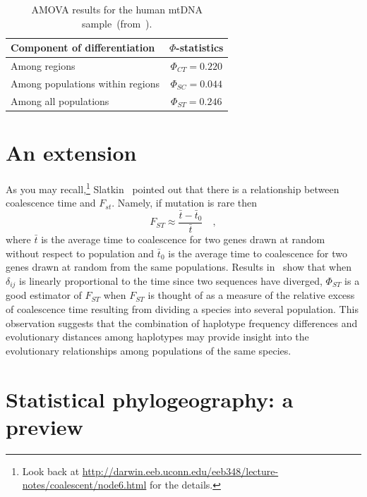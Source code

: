 \documentclass[12pt]{article}
\begin{document}
\begin{table}
\begin{center}
\begin{tabular}{lc}
\hline\hline
Component of differentiation     & $\Phi$-statistics \\
\hline
Among regions                    & $\Phi_{CT} = 0.220$ \\
Among populations within regions & $\Phi_{SC} = 0.044$ \\
Among all populations            & $\Phi_{ST} = 0.246$ \\
\hline
\end{tabular}
\end{center}
\caption{AMOVA results for the human mtDNA
  sample~(from~\cite{Excoffier-etal92}).}\label{table:amova-results}
\end{table}

\section*{An extension}

As you may recall,\footnote{Look back at
  \url{http://darwin.eeb.uconn.edu/eeb348/lecture-notes/coalescent/node6.html}
  for the details.}
Slatkin~\cite{Slatkin91-coalescence} pointed out that there is a
relationship between coalescence time and $F_{st}$. Namely, if
mutation is rare then
\[
F_{ST} \approx \frac{\bar t - \bar t_0}{\bar t} \quad ,
\]
where $\bar t$ is the average time to coalescence for two genes drawn
at random without respect to population and $\bar t_0$ is the average
time to coalescence for two genes drawn at random from the same
populations. Results in~\cite{Holsinger-MasonGamer96} show that when
$\delta_{ij}$ is linearly proportional to the time since two sequences
have diverged, $\Phi_{ST}$ is a good estimator of $F_{ST}$ when
$F_{ST}$ is thought of as a measure of the relative excess of
coalescence time resulting from dividing a species into several
population. This observation suggests that the combination of
haplotype frequency differences and evolutionary distances among
haplotypes may provide insight into the evolutionary relationships
among populations of the same species.

\section*{Statistical phylogeography: a preview}
\end{document}

